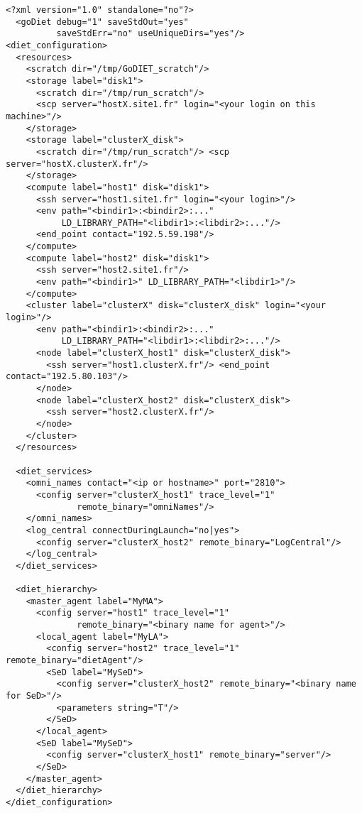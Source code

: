 
\begin{lstlisting}
<?xml version="1.0" standalone="no"?>
  <goDiet debug="1" saveStdOut="yes" 
          saveStdErr="no" useUniqueDirs="yes"/>
<diet_configuration>
  <resources>
    <scratch dir="/tmp/GoDIET_scratch"/>
    <storage label="disk1">
      <scratch dir="/tmp/run_scratch"/>
      <scp server="hostX.site1.fr" login="<your login on this machine>"/>
    </storage>
    <storage label="clusterX_disk">
      <scratch dir="/tmp/run_scratch"/> <scp server="hostX.clusterX.fr"/>
    </storage>
    <compute label="host1" disk="disk1">
      <ssh server="host1.site1.fr" login="<your login>"/>
      <env path="<bindir1>:<bindir2>:..."
           LD_LIBRARY_PATH="<libdir1>:<libdir2>:..."/>
      <end_point contact="192.5.59.198"/>
    </compute>
    <compute label="host2" disk="disk1">
      <ssh server="host2.site1.fr"/>
      <env path="<bindir1>" LD_LIBRARY_PATH="<libdir1>"/>
    </compute>
    <cluster label="clusterX" disk="clusterX_disk" login="<your login>"/>
      <env path="<bindir1>:<bindir2>:..."
           LD_LIBRARY_PATH="<libdir1>:<libdir2>:..."/>
      <node label="clusterX_host1" disk="clusterX_disk">
        <ssh server="host1.clusterX.fr"/> <end_point contact="192.5.80.103"/>
      </node>
      <node label="clusterX_host2" disk="clusterX_disk">
        <ssh server="host2.clusterX.fr"/>
      </node>
    </cluster>
  </resources>
 
  <diet_services>
    <omni_names contact="<ip or hostname>" port="2810">
      <config server="clusterX_host1" trace_level="1" 
              remote_binary="omniNames"/>
    </omni_names>
    <log_central connectDuringLaunch="no|yes">
      <config server="clusterX_host2" remote_binary="LogCentral"/>
    </log_central>
  </diet_services>
 
  <diet_hierarchy>
    <master_agent label="MyMA">
      <config server="host1" trace_level="1"
              remote_binary="<binary name for agent>"/>
      <local_agent label="MyLA">
        <config server="host2" trace_level="1" remote_binary="dietAgent"/>
        <SeD label="MySeD">
          <config server="clusterX_host2" remote_binary="<binary name for SeD>"/>
          <parameters string="T"/>
        </SeD>
      </local_agent>
      <SeD label="MySeD">
        <config server="clusterX_host1" remote_binary="server"/>
      </SeD>
    </master_agent>
  </diet_hierarchy>      
</diet_configuration>
\end{lstlisting}



